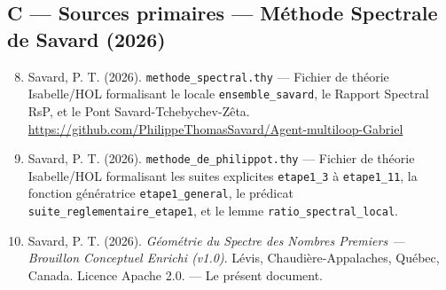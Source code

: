 \documentclass[11pt,a4paper]{article}
\begin{document}
\subsection*{C --- Sources primaires --- Méthode Spectrale de Savard (2026)}

\begin{enumerate}\setcounter{enumi}{7}
\item Savard, P. T. (2026). \texttt{methode\_spectral.thy} --- Fichier de théorie Isabelle/HOL formalisant le locale \texttt{ensemble\_savard}, le Rapport Spectral RsP, et le Pont Savard-Tchebychev-Zêta. \url{https://github.com/PhilippeThomasSavard/Agent-multiloop-Gabriel}

\item Savard, P. T. (2026). \texttt{methode\_de\_philippot.thy} --- Fichier de théorie Isabelle/HOL formalisant les suites explicites \texttt{etape1\_3} à \texttt{etape1\_11}, la fonction génératrice \texttt{etape1\_general}, le prédicat \texttt{suite\_reglementaire\_etape1}, et le lemme \texttt{ratio\_spectral\_local}.

\item Savard, P. T. (2026). \emph{Géométrie du Spectre des Nombres Premiers --- Brouillon Conceptuel Enrichi (v1.0)}. Lévis, Chaudière-Appalaches, Québec, Canada. Licence Apache 2.0. --- Le présent document.
\end{enumerate}
\end{document}

